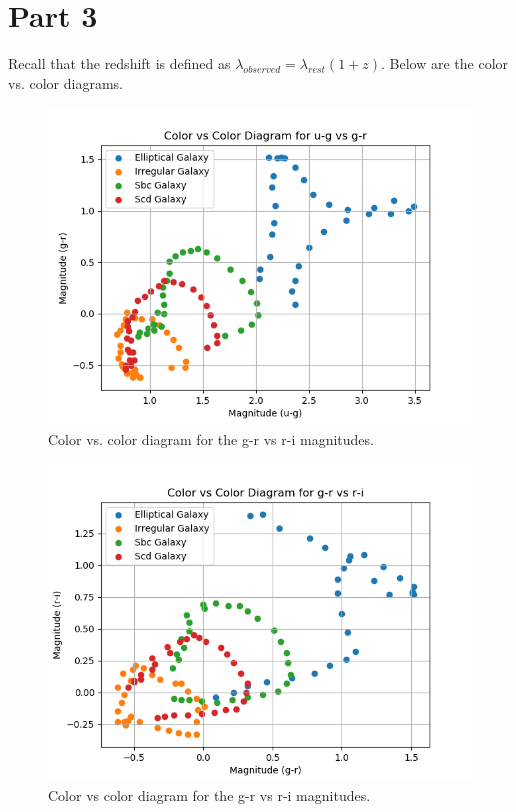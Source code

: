 \documentclass[12pt]{article}
\begin{document}
\section{Part 3}
Recall that the redshift is defined as $\lambda_{observed} = \lambda_{rest} (1 + z)$. 
Below are the color vs. color diagrams.
\begin{center}
	\begin{figure}[H]
	\includegraphics[scale=1.0]{u_g_vs_g_r.png}
	\caption{Color vs. color diagram for the g-r vs r-i magnitudes.}
	\end{figure}
	
	\begin{figure}
	\includegraphics[scale=1.0]{g_r_vs_r_i.png}
	\caption{Color vs color diagram for the g-r vs r-i magnitudes.}
	\end{figure}
	

\end{center}
\end{document}
